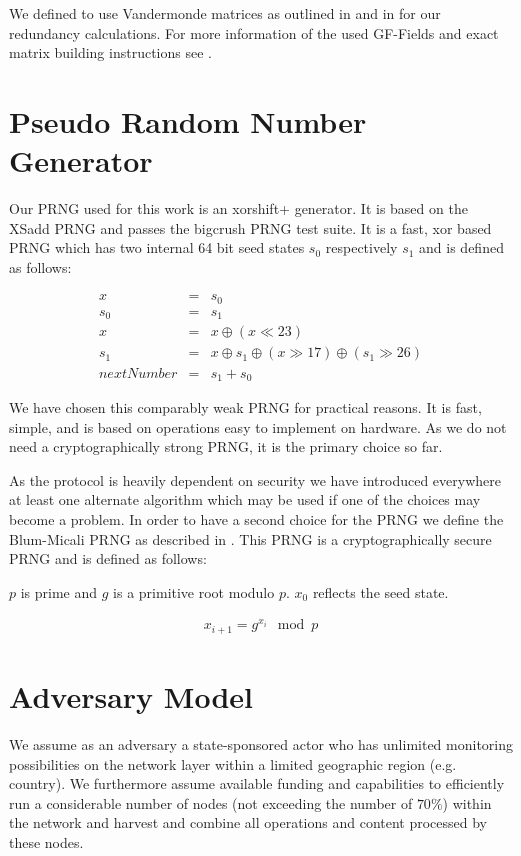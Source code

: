 \documentclass[9pt,journal,compsoc]{IEEEtran}
\begin{document}
We defined to use Vandermonde matrices as outlined in \cite{pd:96:rs} and in \cite{pd:03:rs} for our redundancy calculations. For more information of the used GF-Fields and exact matrix building instructions see \cite{messageVortex}.

\section{Pseudo Random Number Generator\label{sec:prng}}
Our PRNG used for this work is an xorshift+ generator. It is based on the XSadd PRNG\cite{marsaglia2003xorshift} and passes the bigcrush PRNG test suite. It is a fast, xor based PRNG which has two internal 64 bit seed states $s_0$ respectively $s_1$ and is defined as follows:

\begin{eqnarray}
x & = & s_0\\
s_0 & = & s_1\\
x & = & x \oplus ( x \ll 23 )\\
s_1 & = & x \oplus s_1 \oplus ( x \gg 17 ) \oplus (s_1 \gg 26 )\\
nextNumber & = & s_1+s_0
\end{eqnarray}

We have chosen this comparably weak PRNG for practical reasons. It is fast, simple, and is based on operations easy to implement on hardware. As we do not need a cryptographically strong PRNG, it is the primary choice so far. 

As the protocol is heavily dependent on security we have introduced everywhere at least one alternate algorithm which may be used if one of the choices may become a problem. In order to have a second choice for the PRNG we define the Blum-Micali PRNG as described in \cite{blum1984generate}. This PRNG is a cryptographically secure PRNG and is defined as follows:

$p$ is prime and $g$ is a primitive root modulo $p$. $x_0$ reflects the seed state.

\begin{eqnarray}
x_{i+1}=g^{x_i}\mod p
\end{eqnarray}


\section{Adversary Model\label{sec:adversary}}
We assume as an adversary a state-sponsored actor who has unlimited monitoring possibilities on the network layer within a limited geographic region (e.g. country). We furthermore assume available funding and capabilities to efficiently run a considerable number of nodes (not exceeding the number of $70\%$) within the network and harvest and combine all operations and content processed by these nodes.
\end{document}
